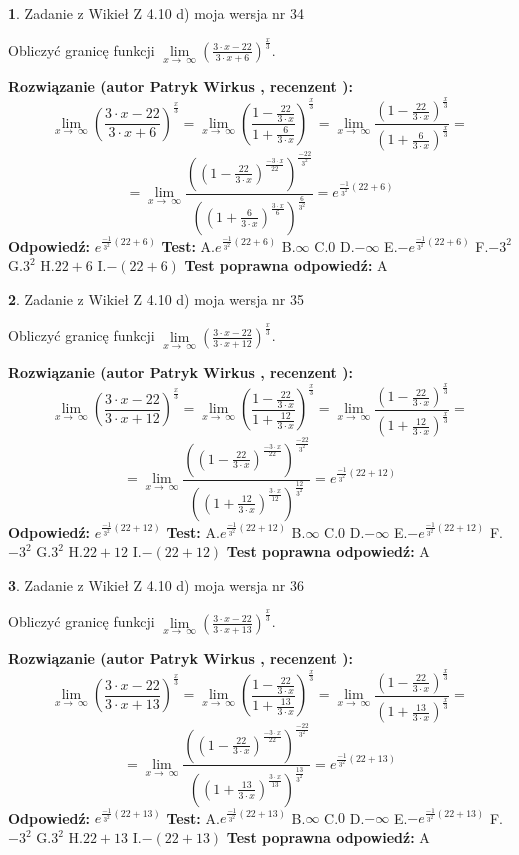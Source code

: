 \documentclass[12pt, a4paper]{article}
\theoremstyle{definition} %
\newtheorem{zad}{}
\newcommand{\zadStart}[1]{\begin{zad}#1\newline}
\newcommand{\zadStop}{\end{zad}}
\newcommand{\rozwStart}[2]{\noindent \textbf{Rozwiązanie (autor #1 , recenzent #2): }\newline}
\newcommand{\rozwStop}{\newline}
\newcommand{\odpStart}{\noindent \textbf{Odpowiedź:}\newline}
\newcommand{\odpStop}{\newline}
\newcommand{\testStart}{\noindent \textbf{Test:}\newline}
\newcommand{\testStop}{\newline}
\newcommand{\kluczStart}{\noindent \textbf{Test poprawna odpowiedź:}\newline}
\newcommand{\kluczStop}{\newline}
\begin{document}
\zadStart{Zadanie z Wikieł Z 4.10 d) moja wersja nr 34}


Obliczyć granicę funkcji  $\lim\limits_{x\to\ \infty}(\frac{3\cdot x-22}{3\cdot x+6})^{\frac{x}{3}}$.
\zadStop
\rozwStart{Patryk Wirkus}{}
$$\lim\limits_{x\to\ \infty}(\frac{3\cdot x-22}{3\cdot x+6})^{\frac{x}{3}} = \lim\limits_{x\to\ \infty}(\frac{1-\frac{22}{3\cdot x}}{1+\frac{6}{3\cdot x}})^{\frac{x}{3}}=\lim\limits_{x\to\ \infty}\frac{(1-\frac{22}{3\cdot x})^{\frac{x}{3}}}{(1+\frac{6}{3\cdot x})^{\frac{x}{3}}}=$$
$$=\lim\limits_{x\to\ \infty}\frac{((1-\frac{22}{3\cdot x})^{\frac{-3\cdot x}{22}})^{\frac{-22}{3^{2}}}}{((1+\frac{6}{3\cdot x})^{\frac{3\cdot x}{6}})^{\frac{6}{3^{2}}}}=e^{\frac{-1}{3^{2}}(22+6)}$$
\rozwStop
\odpStart
$e^{\frac{-1}{3^{2}}(22+6)}$
\odpStop
\testStart
A.$e^{\frac{-1}{3^{2}}(22+6)}$ B.$\infty$ C.$0$ D.$-\infty$ E.$-e^{\frac{-1}{3^{2}}(22+6)}$
F.$-3^{2}$ G.$3^{2}$
H.$22+6$
I.$-(22+6)$
\testStop
\kluczStart
A
\kluczStop



\zadStart{Zadanie z Wikieł Z 4.10 d) moja wersja nr 35}


Obliczyć granicę funkcji  $\lim\limits_{x\to\ \infty}(\frac{3\cdot x-22}{3\cdot x+12})^{\frac{x}{3}}$.
\zadStop
\rozwStart{Patryk Wirkus}{}
$$\lim\limits_{x\to\ \infty}(\frac{3\cdot x-22}{3\cdot x+12})^{\frac{x}{3}} = \lim\limits_{x\to\ \infty}(\frac{1-\frac{22}{3\cdot x}}{1+\frac{12}{3\cdot x}})^{\frac{x}{3}}=\lim\limits_{x\to\ \infty}\frac{(1-\frac{22}{3\cdot x})^{\frac{x}{3}}}{(1+\frac{12}{3\cdot x})^{\frac{x}{3}}}=$$
$$=\lim\limits_{x\to\ \infty}\frac{((1-\frac{22}{3\cdot x})^{\frac{-3\cdot x}{22}})^{\frac{-22}{3^{2}}}}{((1+\frac{12}{3\cdot x})^{\frac{3\cdot x}{12}})^{\frac{12}{3^{2}}}}=e^{\frac{-1}{3^{2}}(22+12)}$$
\rozwStop
\odpStart
$e^{\frac{-1}{3^{2}}(22+12)}$
\odpStop
\testStart
A.$e^{\frac{-1}{3^{2}}(22+12)}$ B.$\infty$ C.$0$ D.$-\infty$ E.$-e^{\frac{-1}{3^{2}}(22+12)}$
F.$-3^{2}$ G.$3^{2}$
H.$22+12$
I.$-(22+12)$
\testStop
\kluczStart
A
\kluczStop



\zadStart{Zadanie z Wikieł Z 4.10 d) moja wersja nr 36}


Obliczyć granicę funkcji  $\lim\limits_{x\to\ \infty}(\frac{3\cdot x-22}{3\cdot x+13})^{\frac{x}{3}}$.
\zadStop
\rozwStart{Patryk Wirkus}{}
$$\lim\limits_{x\to\ \infty}(\frac{3\cdot x-22}{3\cdot x+13})^{\frac{x}{3}} = \lim\limits_{x\to\ \infty}(\frac{1-\frac{22}{3\cdot x}}{1+\frac{13}{3\cdot x}})^{\frac{x}{3}}=\lim\limits_{x\to\ \infty}\frac{(1-\frac{22}{3\cdot x})^{\frac{x}{3}}}{(1+\frac{13}{3\cdot x})^{\frac{x}{3}}}=$$
$$=\lim\limits_{x\to\ \infty}\frac{((1-\frac{22}{3\cdot x})^{\frac{-3\cdot x}{22}})^{\frac{-22}{3^{2}}}}{((1+\frac{13}{3\cdot x})^{\frac{3\cdot x}{13}})^{\frac{13}{3^{2}}}}=e^{\frac{-1}{3^{2}}(22+13)}$$
\rozwStop
\odpStart
$e^{\frac{-1}{3^{2}}(22+13)}$
\odpStop
\testStart
A.$e^{\frac{-1}{3^{2}}(22+13)}$ B.$\infty$ C.$0$ D.$-\infty$ E.$-e^{\frac{-1}{3^{2}}(22+13)}$
F.$-3^{2}$ G.$3^{2}$
H.$22+13$
I.$-(22+13)$
\testStop
\kluczStart
A
\kluczStop
\end{document}
